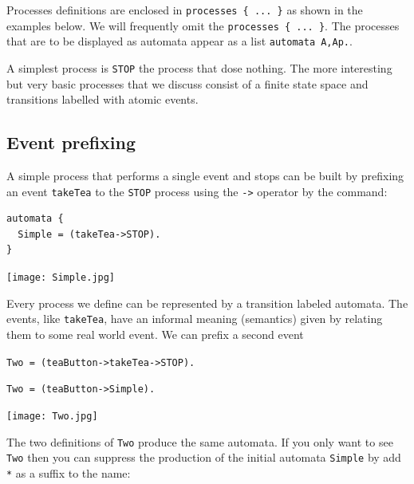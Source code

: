 \documentclass[]{article}
\begin{document}


Processes definitions are enclosed in \verb$processes { ... }$ as shown in the examples below.  We will frequently omit the \verb$processes { ... }$. The processes that are to be displayed as automata  appear as a list \verb$automata A,Ap.$.



A simplest  process is \verb$STOP$ the process that dose nothing.  The more interesting  but very  basic processes that we discuss consist of a  finite state space and  transitions labelled with  atomic events.

\subsection{Event prefixing }
A simple process that performs  a single event  and stops can be built by prefixing  an event \verb$takeTea$ to the  \verb$STOP$ process using the \verb$->$ operator  by the command:

\noindent\hspace{\fill} \begin{minipage}{0.4\textwidth}
\begin{verbatim}
automata {
  Simple = (takeTea->STOP).
}\end{verbatim}
\end{minipage}
\begin{minipage}{0.25\textwidth}\texttt{[image: Simple.jpg]}\end{minipage}\hspace{\fill}

\noindent  Every process we define can be represented by a transition labeled automata. The events, like  \verb$takeTea$,  have an informal meaning (semantics) given by relating them to  some  real world event. We can prefix  a second event

\noindent\begin{center}  \begin{minipage}{0.45\textwidth}
\verb$Two = (teaButton->takeTea->STOP).$

\verb$Two = (teaButton->Simple).$   \end{minipage}\begin{minipage}{0.45\textwidth}\texttt{[image: Two.jpg]}\end{minipage}\end{center}

The two definitions of \verb|Two| produce the same automata. If you only want to see \verb|Two| then you can suppress the production of the initial automata \verb|Simple| by add \verb|*| as a suffix to the name:
\end{document}
